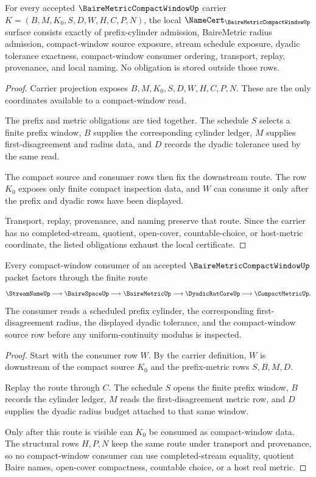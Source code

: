 \begin{theorem}
\label{thm:baire-metric-compact-window-namecert-obligations}
For every accepted $\BaireMetricCompactWindowUp$ carrier $K=(B,M,K_0,S,D,W,H,C,P,N)$, the local $\NameCert_{\BaireMetricCompactWindowUp}$ surface consists exactly of prefix-cylinder admission, BaireMetric radius admission, compact-window source exposure, stream schedule exposure, dyadic tolerance exactness, compact-window consumer ordering, transport, replay, provenance, and local naming. No obligation is stored outside those rows.
\end{theorem}
\begin{proof}
Carrier projection exposes $B,M,K_0,S,D,W,H,C,P,N$. These are the only coordinates available to a compact-window read.

The prefix and metric obligations are tied together. The schedule $S$ selects a finite prefix window, $B$ supplies the corresponding cylinder ledger, $M$ supplies first-disagreement and radius data, and $D$ records the dyadic tolerance used by the same read.

The compact source and consumer rows then fix the downstream route. The row $K_0$ exposes only finite compact inspection data, and $W$ can consume it only after the prefix and dyadic rows have been displayed.

Transport, replay, provenance, and naming preserve that route. Since the carrier has no completed-stream, quotient, open-cover, countable-choice, or host-metric coordinate, the listed obligations exhaust the local certificate.
\end{proof}

\begin{theorem}
\label{thm:baire-metric-compact-window-cylinder-route}
Every compact-window consumer of an accepted $\BaireMetricCompactWindowUp$ packet factors through the finite route
$$
\StreamNameUp \longrightarrow \BaireSpaceUp \longrightarrow \BaireMetricUp \longrightarrow \DyadicRatCoreUp \longrightarrow \CompactMetricUp .
$$
The consumer reads a scheduled prefix cylinder, the corresponding first-disagreement radius, the displayed dyadic tolerance, and the compact-window source row before any uniform-continuity modulus is inspected.
\end{theorem}
\begin{proof}
Start with the consumer row $W$. By the carrier definition, $W$ is downstream of the compact source $K_0$ and the prefix-metric rows $S,B,M,D$.

Replay the route through $C$. The schedule $S$ opens the finite prefix window, $B$ records the cylinder ledger, $M$ reads the first-disagreement metric row, and $D$ supplies the dyadic radius budget attached to that same window.

Only after this route is visible can $K_0$ be consumed as compact-window data. The structural rows $H,P,N$ keep the same route under transport and provenance, so no compact-window consumer can use completed-stream equality, quotient Baire names, open-cover compactness, countable choice, or a host real metric.
\end{proof}

